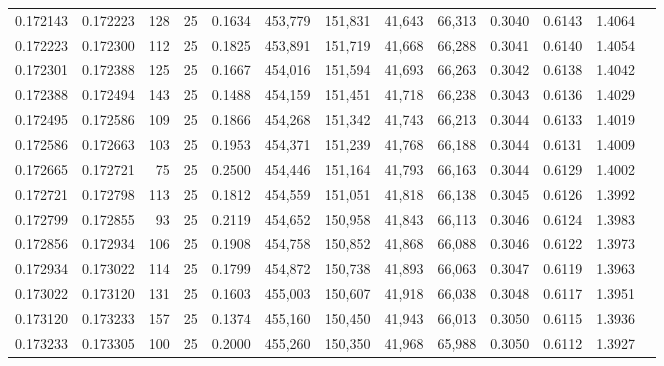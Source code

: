 \begin{tabular}{rrrrrrrrrrrrr}
0.172143 & 0.172223 &   128 &  25 &                                     0.1634 & 453,779 & 151,831 &  41,643 &  66,313 & 0.3040 & 0.6143 & 1.4064 \\
0.172223 & 0.172300 &   112 &  25 &                                     0.1825 & 453,891 & 151,719 &  41,668 &  66,288 & 0.3041 & 0.6140 & 1.4054 \\
0.172301 & 0.172388 &   125 &  25 &                                     0.1667 & 454,016 & 151,594 &  41,693 &  66,263 & 0.3042 & 0.6138 & 1.4042 \\
0.172388 & 0.172494 &   143 &  25 &                                     0.1488 & 454,159 & 151,451 &  41,718 &  66,238 & 0.3043 & 0.6136 & 1.4029 \\
0.172495 & 0.172586 &   109 &  25 &                                     0.1866 & 454,268 & 151,342 &  41,743 &  66,213 & 0.3044 & 0.6133 & 1.4019 \\
0.172586 & 0.172663 &   103 &  25 &                                     0.1953 & 454,371 & 151,239 &  41,768 &  66,188 & 0.3044 & 0.6131 & 1.4009 \\
0.172665 & 0.172721 &    75 &  25 &                                     0.2500 & 454,446 & 151,164 &  41,793 &  66,163 & 0.3044 & 0.6129 & 1.4002 \\
0.172721 & 0.172798 &   113 &  25 &                                     0.1812 & 454,559 & 151,051 &  41,818 &  66,138 & 0.3045 & 0.6126 & 1.3992 \\
0.172799 & 0.172855 &    93 &  25 &                                     0.2119 & 454,652 & 150,958 &  41,843 &  66,113 & 0.3046 & 0.6124 & 1.3983 \\
0.172856 & 0.172934 &   106 &  25 &                                     0.1908 & 454,758 & 150,852 &  41,868 &  66,088 & 0.3046 & 0.6122 & 1.3973 \\
0.172934 & 0.173022 &   114 &  25 &                                     0.1799 & 454,872 & 150,738 &  41,893 &  66,063 & 0.3047 & 0.6119 & 1.3963 \\
0.173022 & 0.173120 &   131 &  25 &                                     0.1603 & 455,003 & 150,607 &  41,918 &  66,038 & 0.3048 & 0.6117 & 1.3951 \\
0.173120 & 0.173233 &   157 &  25 &                                     0.1374 & 455,160 & 150,450 &  41,943 &  66,013 & 0.3050 & 0.6115 & 1.3936 \\
0.173233 & 0.173305 &   100 &  25 &                                     0.2000 & 455,260 & 150,350 &  41,968 &  65,988 & 0.3050 & 0.6112 & 1.3927 \\

\end{tabular}
